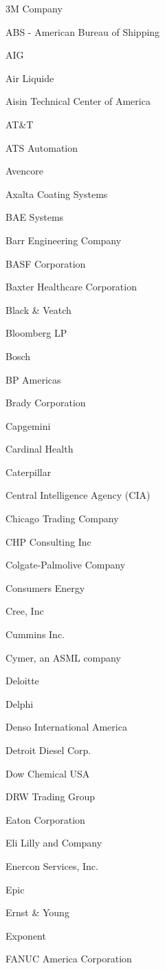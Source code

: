 \documentclass[twoside]{article}
\begin{document}
\begin{center}
\begin{multicols}{5}
\begin{FlushLeft}
\begin{compactitem}
        \item 3M Company
\item ABS - American Bureau of Shipping
\item AIG
\item Air Liquide
\item Aisin Technical Center of America
\item AT\&T
\item ATS Automation
\item Avencore
\item Axalta Coating Systems
\item BAE Systems
\item Barr Engineering Company
\item BASF Corporation
\item Baxter Healthcare Corporation
\item Black \& Veatch
\item Bloomberg LP
\item Bosch
\item BP Americas
\item Brady Corporation
\item Capgemini
\item Cardinal Health
\item Caterpillar
\item Central Intelligence Agency (CIA)
\item Chicago Trading Company
\item CHP Consulting Inc
\item Colgate-Palmolive Company
\item Consumers Energy
\item Cree, Inc
\item Cummins Inc.
\item Cymer, an ASML company
\item Deloitte
\item Delphi
\item Denso International America
\item Detroit Diesel Corp.
\item Dow Chemical USA
\item DRW Trading Group
\item Eaton Corporation
\item Eli Lilly and Company
\item Enercon Services, Inc.
\item Epic
\item Ernst \& Young
\item Exponent
\item FANUC America Corporation

\end{compactitem}
\end{FlushLeft}
\end{multicols}
\end{center}
\end{document}
